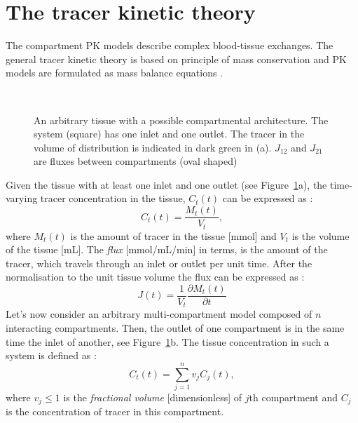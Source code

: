 \section{The tracer kinetic theory} 
The compartment PK models describe complex blood-tissue exchanges. The general tracer kinetic theory is based on  principle of mass conservation and PK models are formulated as mass balance equations \cite{khalifa2014models, thesis}. 
\begin{figure}[H]
\captionsetup[subfloat]{captionskip=0.5cm}
	\centering
	\\	
\vspace{0.5cm}
\caption[An arbitrary multi-compartment model]{An arbitrary tissue with a possible compartmental architecture. The system (square) has one inlet and one outlet.
The tracer in the volume of distribution is
indicated in dark green in (a). $J_{12}$ and $J_{21}$ are fluxes between compartments (oval shaped)}
\label{fig:model}
\end{figure}
\noindent Given the tissue with at least one inlet and one outlet (see Figure~\ref{fig:model}a), the time-varying tracer concentration in the tissue, $C_t(t)$ can be expressed as \cite{thesis}:
\begin{equation}
C_t(t) = \frac{M_t(t)}{V_t},
\label{eq:pk1}
\end{equation}
where $M_t(t)$ is the amount of tracer in the tissue [mmol] and $V_t$ is the volume of the tissue [mL]. The \textit{flux} [mmol/mL/min] in terms, is the amount of the tracer, which travels through an inlet or outlet per unit time. After the normalisation to the unit tissue volume the flux can be expressed as \cite{thesis}:
\begin{equation}
J(t) = \frac{1}{V_t}\frac{\partial M_t(t)}{\partial t}
\label{eq:pk2}
\end{equation} 
Let's now consider an arbitrary multi-compartment model composed of $n$ interacting compartments. Then, the outlet of one compartment is in the same time the inlet of another, see Figure~\ref{fig:model}b. The tissue concentration in such a system is defined as \cite{thesis}:   
\begin{equation}
C_t(t) = \sum_{j=1}^{n}v_jC_j(t),
\label{eq:pk3}
\end{equation}
where $v_j\leq1$ is the \textit{fractional volume} [dimensionless] of $j$th compartment and $C_j$ is the concentration of tracer in this compartment. 
